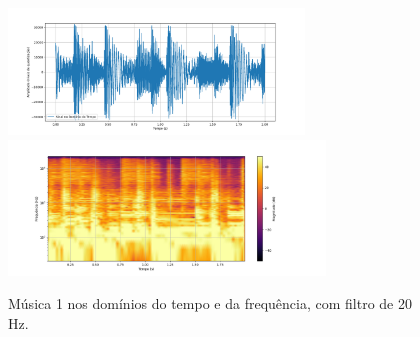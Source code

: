 \begin{figure}[htpb]
    \centering
    \includegraphics[width=0.7\textwidth]{figuras/fig81.png}
    \includegraphics[width=0.75\textwidth]{figuras/fig82.png}
    \caption{Música 1 nos domínios do tempo e da frequência, com filtro de 20 Hz.}
    \label{fig81}
\end{figure}

